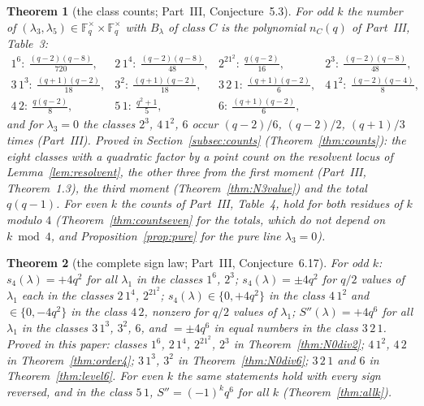 \documentclass[12pt,a4paper]{amsart}
\newtheorem{theorem}{Theorem}[section]
\theoremstyle{definition}
\newcommand{\F}{\mathbb{F}}
\newcommand{\Spp}{S''}
\begin{document}
\begin{theorem}[the class counts; Part~III, Conjecture~5.3]\label{tgt:counts}
For odd $k$ the number of $(\lambda_3,\lambda_5)\in\F_q^\times\times\F_q^\times$ with $B_\lambda$ of class $C$ is the polynomial $n_C(q)$ of Part~III, Table~3:
\[
\begin{array}{llll}
1^6:\ \tfrac{(q-2)(q-8)}{720}, & 2\,1^4:\ \tfrac{(q-2)(q-8)}{48}, & 2^21^2:\ \tfrac{q(q-2)}{16}, & 2^3:\ \tfrac{(q-2)(q-8)}{48},\\[0.5ex]
3\,1^3:\ \tfrac{(q+1)(q-2)}{18}, & 3^2:\ \tfrac{(q+1)(q-2)}{18}, & 3\,2\,1:\ \tfrac{(q+1)(q-2)}{6}, & 4\,1^2:\ \tfrac{(q-2)(q-4)}{8},\\[0.5ex]
4\,2:\ \tfrac{q(q-2)}{8}, & 5\,1:\ \tfrac{q^2+1}{5}, & 6:\ \tfrac{(q+1)(q-2)}{6}, &
\end{array}
\]
and for $\lambda_3=0$ the classes $2^3$, $4\,1^2$, $6$ occur $(q-2)/6$, $(q-2)/2$, $(q+1)/3$ times (Part~III).
\emph{Proved in Section~\ref{subsec:counts} (Theorem~\ref{thm:counts}): the eight classes with a quadratic factor by a point count on the resolvent locus of Lemma~\ref{lem:resolvent}, the other three from the first moment (Part~III, Theorem~1.3), the third moment (Theorem~\ref{thm:N3value}) and the total $q(q-1)$.} For even $k$ the counts of Part~III, Table~4, hold for both residues of $k$ modulo $4$ \emph{(Theorem~\ref{thm:countseven} for the totals, which do not depend on $k\bmod4$, and Proposition~\ref{prop:pure} for the pure line $\lambda_3=0$)}.
\end{theorem}

\begin{theorem}[the complete sign law; Part~III, Conjecture~6.17]\label{tgt:signs}
For odd $k$: $s_4(\lambda)=+4q^2$ for all $\lambda_1$ in the classes $1^6$, $2^3$; $s_4(\lambda)=\pm4q^2$ for $q/2$ values of $\lambda_1$ each in the classes $2\,1^4$, $2^21^2$; $s_4(\lambda)\in\{0,+4q^2\}$ in the class $4\,1^2$ and $\in\{0,-4q^2\}$ in the class $4\,2$, nonzero for $q/2$ values of $\lambda_1$; $\Spp(\lambda)=+4q^6$ for all $\lambda_1$ in the classes $3\,1^3$, $3^2$, $6$, and $=\pm4q^6$ in equal numbers in the class $3\,2\,1$.
\emph{Proved in this paper: classes $1^6$, $2\,1^4$, $2^21^2$, $2^3$ in Theorem~\ref{thm:N0div2}; $4\,1^2$, $4\,2$ in Theorem~\ref{thm:order4}; $3\,1^3$, $3^2$ in Theorem~\ref{thm:N0div6}; $3\,2\,1$ and $6$ in Theorem~\ref{thm:level6}.} For even $k$ the same statements hold with every sign reversed, and in the class $5\,1$, $\Spp=(-1)^kq^6$ for all $k$ \emph{(Theorem~\ref{thm:allk})}.
\end{theorem}
\end{document}
